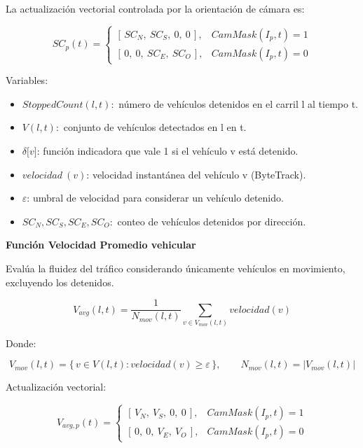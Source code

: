 \documentclass[12pt,a4paper,oneside]{report}
\begin{document}
La actualización vectorial controlada por la orientación de cámara es:

\begin{equation}
SC_{p}(t) =
\begin{cases}
\left[\, SC_{N},\ SC_{S},\ 0,\ 0 \,\right], & CamMask(I_{p},t) = 1\\[2pt]
\left[\, 0,\ 0,\ SC_{E},\ SC_{O} \,\right], & CamMask(I_{p},t) = 0
\end{cases}
\end{equation}

Variables:

\begin{itemize}
\item
  \(StoppedCount(l,t):\) número de vehículos detenidos en el carril l al tiempo t.
\item
  \(V(l,t):\) conjunto de vehículos detectados en l en t.
\item
  \(\delta\lbrack v\rbrack\): función indicadora que vale 1 si el vehículo v está detenido.
\item
  \(velocidad\ (v)\): velocidad instantánea del vehículo v (ByteTrack).
\item
  \(\varepsilon\): umbral de velocidad para considerar un vehículo detenido.
\item
  \(SC_{N},SC_{S},SC_{E},SC_{O}:\) conteo de vehículos detenidos por dirección.
\end{itemize}

\textbf{Función Velocidad Promedio vehicular}

Evalúa la fluidez del tráfico considerando únicamente vehículos en movimiento, excluyendo los detenidos.

\begin{equation}
V_{avg}(l,t) = \frac{1}{N_{mov}(l,t)}\sum_{v \in V_{mov}(l,t)} velocidad(v)
\label{eq:vavg}
\end{equation}

Donde:

\begin{equation}
V_{mov}(l,t) = \{\, v \in V(l,t) : velocidad(v) \geq \varepsilon \,\}, \qquad N_{mov}(l,t) = \left| V_{mov}(l,t) \right|
\end{equation}

Actualización vectorial:

\begin{equation}
V_{avg,p}(t) =
\begin{cases}
\left[\, V_{N},\ V_{S},\ 0,\ 0 \,\right], & CamMask(I_{p},t) = 1\\[2pt]
\left[\, 0,\ 0,\ V_{E},\ V_{O} \,\right], & CamMask(I_{p},t) = 0
\end{cases}
\end{equation}
\end{document}
